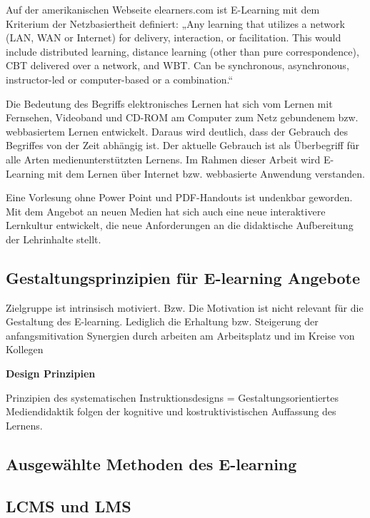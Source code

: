 \documentclass[a4paper, 12pt, twoside, BCOR=20mm, DIV=calc, abstracton, parskip=half*, toc=bibliography, toc=listof, headsepline, footsepline, headings=small, numbers=enddot]{scrreprt}
\begin{document}
	Auf der amerikanischen Webseite elearners.com  ist E-Learning mit dem Kriterium der Netzbasiertheit definiert:
	„Any learning that utilizes a network (LAN, WAN or Internet) for delivery, interaction,
	or facilitation. This would include distributed learning, distance learning (other
	than pure correspondence), CBT delivered over a network, and WBT. Can be synchronous,
	asynchronous, instructor-led or computer-based or a combination.“\cite{aldrich2003simulations}
	
	Die Bedeutung des Begriffs elektronisches Lernen hat sich vom Lernen mit Fernsehen, Videoband und CD-ROM am Computer zum Netz gebundenem bzw. webbasiertem Lernen entwickelt. 
	Daraus wird deutlich, dass der Gebrauch des Begriffes von der Zeit abhängig ist. Der aktuelle Gebrauch ist als Überbegriff für alle Arten medienunterstützten Lernens.\cite[S.22 ff.]{baumgartner2002learning} Im Rahmen dieser Arbeit wird E-Learning mit dem Lernen über Internet bzw. webbasierte Anwendung verstanden. 
	
	
	Eine Vorlesung ohne Power Point und PDF-Handouts ist undenkbar geworden. Mit dem Angebot an neuen Medien hat sich auch eine neue interaktivere Lernkultur entwickelt, die neue Anforderungen an die didaktische Aufbereitung der Lehrinhalte stellt. 
	
	\subsection{Gestaltungsprinzipien für E-learning Angebote}
	Zielgruppe ist intrinsisch motiviert. Bzw. Die Motivation ist nicht relevant für die Gestaltung des E-learning. Lediglich die Erhaltung bzw. Steigerung der anfangsmitivation
	Synergien durch arbeiten am Arbeitsplatz und im Kreise von Kollegen
	
	\textbf{Design Prinzipien}
	
	Prinzipien des systematischen Instruktionsdesigns = Gestaltungsorientiertes Mediendidaktik
	folgen der kognitive und kostruktivistischen Auffassung des Lernens. 
	
	\subsection{Ausgewählte Methoden des E-learning}
	
	
	
	\subsection{\ac{LCMS} und \ac{LMS}}
	
\end{document}
